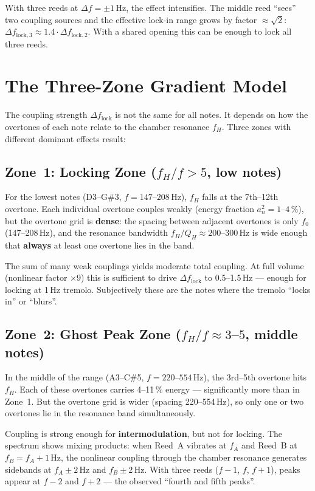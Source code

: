 \documentclass[11pt,a4paper]{article}
\begin{document}
With three reeds at $\Delta f = \pm 1$\,Hz, the effect intensifies. The middle reed ``sees'' two coupling sources and the effective lock-in range grows by factor $\approx \sqrt{2}$: $\Delta f_{\text{lock},3} \approx 1{.}4 \cdot \Delta f_{\text{lock},2}$. With a shared opening this can be enough to lock all three reeds.

\section{The Three-Zone Gradient Model}

The coupling strength $\Delta f_\text{lock}$ is not the same for all notes. It depends on how the overtones of each note relate to the chamber resonance $f_H$. Three zones with different dominant effects result:

\subsection{\textcolor{zone1blue}{Zone~1: Locking Zone ($f_H/f > 5$, low notes)}}

For the lowest notes (D3--G\#3, $f = 147$--$208$\,Hz), $f_H$ falls at the 7th--12th overtone. Each individual overtone couples weakly (energy fraction $a_n^2 = 1$--$4\,\%$), but the overtone grid is \textbf{dense}: the spacing between adjacent overtones is only $f_0$ (147--208\,Hz), and the resonance bandwidth $f_H/Q_H \approx 200$--$300$\,Hz is wide enough that \textbf{always} at least one overtone lies in the band.

The sum of many weak couplings yields moderate total coupling. At full volume (nonlinear factor $\times 9$) this is sufficient to drive $\Delta f_\text{lock}$ to 0.5--1.5\,Hz --- enough for locking at 1\,Hz tremolo. Subjectively these are the notes where the tremolo ``locks in'' or ``blurs''.

\subsection{\textcolor{zone2orange}{Zone~2: Ghost Peak Zone ($f_H/f \approx 3$--$5$, middle notes)}}

In the middle of the range (A3--C\#5, $f = 220$--$554$\,Hz), the 3rd--5th overtone hits $f_H$. Each of these overtones carries 4--11\,\% energy --- significantly more than in Zone~1. But the overtone grid is wider (spacing 220--554\,Hz), so only one or two overtones lie in the resonance band simultaneously.

Coupling is strong enough for \textbf{intermodulation}, but not for locking. The spectrum shows mixing products: when Reed~A vibrates at $f_A$ and Reed~B at $f_B = f_A + 1$\,Hz, the nonlinear coupling through the chamber resonance generates sidebands at $f_A \pm 2$\,Hz and $f_B \pm 2$\,Hz. With three reeds ($f-1$, $f$, $f+1$), peaks appear at $f-2$ and $f+2$ --- the observed ``fourth and fifth peaks''.
\end{document}
